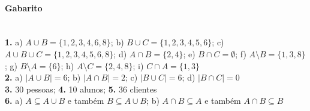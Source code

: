 \documentclass[a4paper,twocolumn,12pt]{article}
\begin{document}
\vfill

{\footnotesize
\paragraph*{Gabarito} \hspace*{\fill}\\
\textbf{1.} a) \(A\cup B = \{1,2,3,4,6,8\}\); b) \(B\cup C = \{1,2,3,4,5,6\}\); c) \(A\cup B \cup C = \{1,2,3,4,5,6,8\}\); d) \(A\cap B = \{2,4\}\); e) \(B\cap C = \emptyset\); f) \(A\setminus B = \{1,3,8\}\); g) \(B\setminus A = \{6\}\); h) \(A\setminus C = \{2,4,8\}\); i) \(C\cap A = \{1,3\}\)\\
\textbf{2.} a) \(|A\cup B| = 6\); b) \(|A\cap B| = 2\); c) \(|B\cup C| = 6\); d) \(|B\cap C| = 0\)\\
\textbf{3.} 30 pessoas; \textbf{4.} 10 alunos; \textbf{5.} 36 clientes\\
\textbf{6.} a) \(A\subseteq A\cup B\) e também $B\subseteq A\cup B$; b) \(A\cap B\subseteq A\) e também \(A\cap B\subseteq B\)
}
\end{document}
